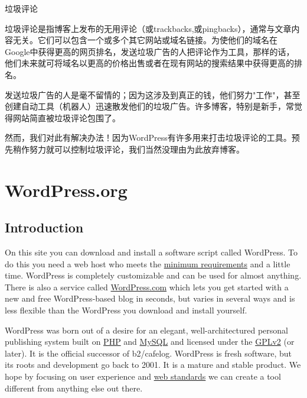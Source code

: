 \begin{compactenum}
\item 垃圾评论

垃圾评论是指博客上发布的无用评论（或trackbacks,或pingbacks），通常与文章内容无关。它们可以包含一个或多个其它网站或域名链接。为使他们的域名在Google中获得更高的网页排名，发送垃圾广告的人把评论作为工具，那样的话，他们未来就可将域名以更高的价格出售或者在现有网站的搜索结果中获得更高的排名。

发送垃圾广告的人是毫不留情的；因为这涉及到真正的钱，他们努力"工作"，甚至创建自动工具（机器人）迅速散发他们的垃圾广告。许多博客，特别是新手，常觉得网站简直被垃圾评论包围了。

然而，我们对此有解决办法！因为WordPress有许多用来打击垃圾评论的工具。预先稍作努力就可以控制垃圾评论，我们当然没理由为此放弃博客。


\end{compactenum}







\chapter{WordPress.org}

\section{Introduction}

On this site you can download and install a software script called WordPress. To do this you need a web host who meets the \href{http://wordpress.org/about/requirements/}{minimum requirements} and a little time. WordPress is completely customizable and can be used for almost anything. There is also a service called \href{http://wordpress.com/?ref=wporg-about}{WordPress.com} which lets you get started with a new and free WordPress-based blog in seconds, but varies in several ways and is less flexible than the WordPress you download and install yourself.

WordPress was born out of a desire for an elegant, well-architectured personal publishing system built on \href{http://php.net/}{PHP} and \href{http://mysql.com/}{MySQL} and licensed under the \href{http://www.gnu.org/copyleft/gpl.html}{GPLv2} (or later). It is the official successor of b2/cafelog. WordPress is fresh software, but its roots and development go back to 2001. It is a mature and stable product. We hope by focusing on user experience and \href{http://webstandards.org/}{web standards} we can create a tool different from anything else out there.

